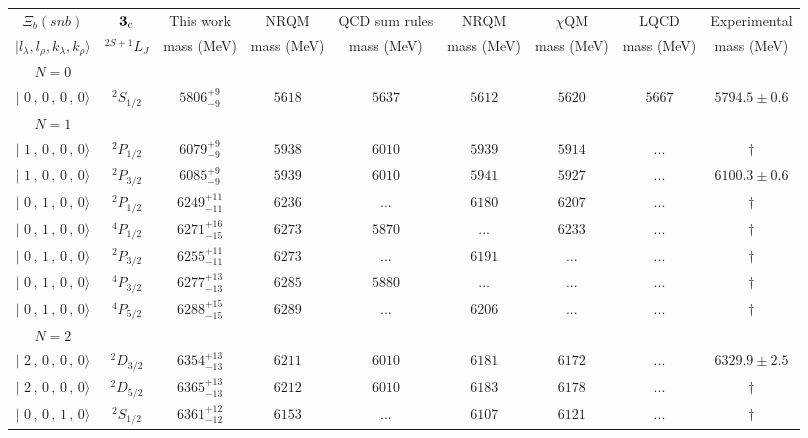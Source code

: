 \begin{tabular}{c c| c c c c c c c}\hline \hline
$\Xi_{b}(snb)$& ${\bf {3}}_{\rm c}$& This work   &   NRQM \cite{Yoshida2015}     &  QCD sum rules \cite{Liu2008, Mao2015, Chen2016}      &  NRQM \cite{Roberts2008}    & $\chi$QM \cite{Kim2021}        & LQCD \cite{Mohanta2020}     & Experimental  \\ 
 $\vert l_{\lambda}, l_{\rho}, k_{\lambda}, k_{\rho} \rangle$ & $^{2S+1}L_{J}$ & mass (MeV)  &   mass (MeV)  &  mass (MeV)  &  mass (MeV) & mass (MeV) & mass (MeV) &      mass (MeV) \\ \hline
\hline
 $N=0$  &  &  &  &  &  \\ 
$\vert \,\,0\,,\,0\,,\,0\,,\,0 \rangle $ & $^{2}S_{1/2}$ & $5806^{+9}_{-9}$ & $5618$ & $5637$ & $5612$ & $5620$ & $5667$ & $5794.5\pm 0.6$ \\ 
\hline
 $N=1$  &  &  &  &  &  \\ 
$\vert \,\,1\,,\,0\,,\,0\,,\,0 \rangle $ & $^{2}P_{1/2}$ & $6079^{+9}_{-9}$ & $5938$ & $6010$ & $5939$ & $5914$ & ... & $\dagger$ \\ 
$\vert \,\,1\,,\,0\,,\,0\,,\,0 \rangle $ & $^{2}P_{3/2}$ & $6085^{+9}_{-9}$ & $5939$ & $6010$ & $5941$ & $5927$ & ... & $6100.3\pm 0.6$ \\ 
$\vert \,\,0\,,\,1\,,\,0\,,\,0 \rangle $ & $^{2}P_{1/2}$ & $6249^{+11}_{-11}$ & $6236$ & ... & $6180$ & $6207$ & ... & $\dagger$ \\ 
$\vert \,\,0\,,\,1\,,\,0\,,\,0 \rangle $ & $^{4}P_{1/2}$ & $6271^{+16}_{-15}$ & $6273$ & $5870$ & ... & $6233$ & ... & $\dagger$ \\ 
$\vert \,\,0\,,\,1\,,\,0\,,\,0 \rangle $ & $^{2}P_{3/2}$ & $6255^{+11}_{-11}$ & $6273$ & ... & $6191$ & ... & ... & $\dagger$ \\ 
$\vert \,\,0\,,\,1\,,\,0\,,\,0 \rangle $ & $^{4}P_{3/2}$ & $6277^{+13}_{-13}$ & $6285$ & $5880$ & ... & ... & ... & $\dagger$ \\ 
$\vert \,\,0\,,\,1\,,\,0\,,\,0 \rangle $ & $^{4}P_{5/2}$ & $6288^{+15}_{-15}$ & $6289$ & ... & $6206$ & ... & ... & $\dagger$ \\ 
\hline
 $N=2$  &  &  &  &  &  \\ 
$\vert \,\,2\,,\,0\,,\,0\,,\,0 \rangle $ & $^{2}D_{3/2}$ & $6354^{+13}_{-13}$ & $6211$ & $6010$ & $6181$ & $6172$ & ... & $6329.9\pm 2.5$ \\ 
$\vert \,\,2\,,\,0\,,\,0\,,\,0 \rangle $ & $^{2}D_{5/2}$ & $6365^{+13}_{-13}$ & $6212$ & $6010$ & $6183$ & $6178$ & ... & $\dagger$ \\ 
$\vert \,\,0\,,\,0\,,\,1\,,\,0 \rangle $ & $^{2}S_{1/2}$ & $6361^{+12}_{-12}$ & $6153$ & ... & $6107$ & $6121$ & ... & $\dagger$ \\ 

\end{tabular}
